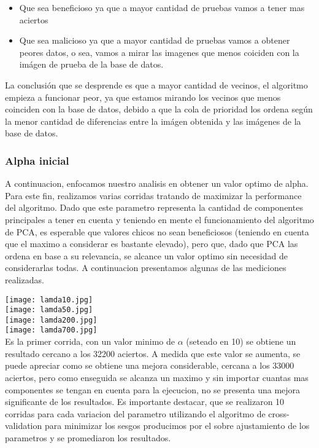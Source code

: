 \begin{itemize}
  \item Que sea beneficioso ya que a mayor cantidad de pruebas vamos a tener mas aciertos
  \item Que sea malicioso ya que a mayor cantidad de pruebas vamos a obtener peores datos, o sea, vamos a mirar las imagenes que menos coiciden con la imágen de prueba de la base de datos.
\end{itemize}

La conclusión que se desprende es que a mayor cantidad de vecinos, el algoritmo empieza a funcionar peor, ya que estamos mirando los vecinos que menos coinciden con la base de datos, debido a que la cola de prioridad los ordena según la menor cantidad de diferencias entre la imágen obtenida y las imágenes de la base de datos. 

\subsubsection{Alpha inicial}
A continuacion, enfocamos nuestro analisis en obtener un valor optimo de alpha. Para este fin, realizamos varias corridas tratando de maximizar la performance del algoritmo. Dado que este parametro representa la cantidad de componentes principales a tener en cuenta y teniendo en mente el funcionamiento del algoritmo de PCA, es esperable que valores chicos no sean beneficiosos (teniendo en cuenta que el maximo a considerar es bastante elevado), pero que, dado que PCA las ordena en base a su relevancia, se alcance un valor optimo sin necesidad de considerarlas todas. A continuacion presentamos algunas de las mediciones realizadas.

\texttt{[image: lamda10.jpg]}\\
\texttt{[image: lamda50.jpg]}\\
\texttt{[image: lamda200.jpg]}\\
\texttt{[image: lamda700.jpg]}\\

Es la primer corrida, con un valor minimo de $\alpha$ (seteado en 10) se obtiene un resultado cercano a los 32200 aciertos. A medida que este valor se aumenta, se puede apreciar como se obtiene una mejora considerable, cercana a los 33000 aciertos, pero como enseguida se alcanza un maximo y sin importar cuantas mas componentes se tengan en cuenta para la ejecucion, no se presenta una mejora significante de los resultados.
Es importante destacar, que se realizaron 10 corridas para cada variacion del parametro utilizando el algoritmo de cross-validation para minimizar los sesgos producimos por el sobre ajustamiento de los parametros y se promediaron los resultados.

